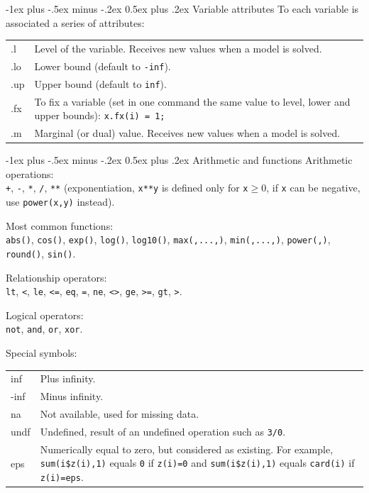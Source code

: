 \documentclass[10pt,landscape,a4paper]{article}
\makeatletter
\renewcommand{\section}{\@startsection{section}{1}{0mm}%
                                {-1ex plus -.5ex minus -.2ex}%
                                {0.5ex plus .2ex}%
                                {\color{blue}\normalfont\large\bfseries}}
\makeatother
\begin{document}
\begin{multicols}{2}
\section{Variable attributes}
To each variable is associated a series of attributes:\\
\begin{tabularx}{\columnwidth}{@{}>{\ttfamily}lX@{}}
  .l & Level of the variable. Receives new values when a model is solved.\\
  .lo & Lower bound (default to \texttt{-inf}).\\
  .up & Upper bound (default to \texttt{inf}).\\
  .fx & To fix a variable (set in one command the same value to level, lower
  and upper bounds):\linebreak{}
  \texttt{x.fx(i) = 1;}\\
  .m & Marginal (or dual) value. Receives new values when a model is solved.
\end{tabularx}

\section{Arithmetic and functions}
Arithmetic operations:\\
\verb!+!, \verb!-!, \verb!*!, \verb!/!, \verb!**! (exponentiation, \verb!x**y!
is defined only for \verb!x!$\ge$0, if \texttt{x} can be negative, use
\verb!power(x,y)! instead).

Most common functions:\\
\verb!abs()!, \verb!cos()!, \verb!exp()!, \verb!log()!, \verb!log10()!,
\verb!max(,...,)!, \verb!min(,...,)!, \verb!power(,)!, \verb!round()!,
\verb!sin()!.

Relationship operators:\\
\verb!lt!, \verb!<!, \verb!le!, \verb!<=!, \verb!eq!, \verb!=!, \verb!ne!, \verb!<>!, \verb!ge!, \verb!>=!, \verb!gt!, \verb!>!.

Logical operators:\\
\verb!not!, \verb!and!, \verb!or!, \verb!xor!.

Special symbols:\\
\begin{tabularx}{\columnwidth}{@{}>{\ttfamily}l>{\raggedright\arraybackslash}X@{}}
  inf& Plus infinity.\\
  -inf& Minus infinity.\\
  na& Not available, used for missing data.\\
  undf& Undefined, result of an undefined operation such as \texttt{3/0}.\\
  eps& Numerically equal to zero, but considered as existing. For example,
  \texttt{sum(i\$z(i),1)} equals \texttt{0} if \texttt{z(i)=0} and
  \texttt{sum(i\$z(i),1)} equals \texttt{card(i)} if \texttt{z(i)=eps}.
\end{tabularx}


\end{multicols}
\end{document}
